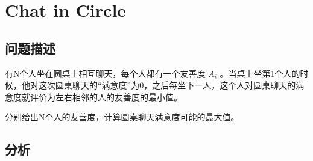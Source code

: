 
\section{Chat in Circle}
\subsection{问题描述}

有N个人坐在圆桌上相互聊天，每个人都有一个友善度 $A_i$ 。当桌上坐第1个人的时候，他对这次圆桌聊天的“满意度”为0，之后每坐下一人，这个人对圆桌聊天的满意度就评价为左右相邻的人的友善度的最小值。

分别给出N个人的友善度，计算圆桌聊天满意度可能的最大值。

\subsection{分析}

